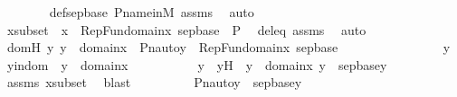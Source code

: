 \begin{isabellebody}
\ \ \ \ \ \ \isamarkupfalse%
\ def{\isacharunderscore}{\kern0pt}sep{\isacharunderscore}{\kern0pt}base\ P{\isacharunderscore}{\kern0pt}name{\isacharunderscore}{\kern0pt}in{\isacharunderscore}{\kern0pt}M\ assms{}\ \isamarkupfalse%
\ auto\ \isanewline
\ \ \ \ \isamarkupfalse%
\ xsubset\ {\isacharcolon}{\kern0pt}\ {\isachardoublequoteopen}x\ {\isasymsubseteq}\ {\isasymUnion}RepFun{\isacharparenleft}{\kern0pt}domain{\isacharparenleft}{\kern0pt}x{}{\isacharparenright}{\kern0pt}{\isacharcomma}{\kern0pt}\ sep{\isacharunderscore}{\kern0pt}base{\isacharparenright}{\kern0pt}\ {\isasymtimes}\ P{\isachardoublequoteclose}\ \isamarkupfalse%
\ deleq\ assms{}\ \isamarkupfalse%
\ auto\ \ \isanewline
\isanewline
\ \ \ \ \isamarkupfalse%
\ domH{\isacharcolon}{\kern0pt}\ {\isachardoublequoteopen}{\isasymAnd}y{\isachardot}{\kern0pt}\ y\ {\isasymin}\ domain{\isacharparenleft}{\kern0pt}x{\isacharparenright}{\kern0pt}\ {\isasymLongrightarrow}\ Pn{\isacharunderscore}{\kern0pt}auto{\isacharparenleft}{\kern0pt}{\isasympi}{\isacharparenright}{\kern0pt}{\isacharbackquote}{\kern0pt}y\ {\isasymin}\ {\isasymUnion}RepFun{\isacharparenleft}{\kern0pt}domain{\isacharparenleft}{\kern0pt}x{}{\isacharparenright}{\kern0pt}{\isacharcomma}{\kern0pt}\ sep{\isacharunderscore}{\kern0pt}base{\isacharparenright}{\kern0pt}{\isachardoublequoteclose}\ \isanewline
\ \ \ \ \isamarkupfalse%
\ {\isacharminus}{\kern0pt}\ \isanewline
\ \ \ \ \ \ \isamarkupfalse%
\ y\ \isamarkupfalse%
\ yindom\ {\isacharcolon}{\kern0pt}\ {\isachardoublequoteopen}y\ {\isasymin}\ domain{\isacharparenleft}{\kern0pt}x{\isacharparenright}{\kern0pt}{\isachardoublequoteclose}\ \isanewline
\ \ \ \ \ \ \isamarkupfalse%
\ \isamarkupfalse%
\ y{}\ \ y{}H\ {\isacharcolon}{\kern0pt}\ {\isachardoublequoteopen}y{}\ {\isasymin}\ domain{\isacharparenleft}{\kern0pt}x{}{\isacharparenright}{\kern0pt}{\isachardoublequoteclose}\ {\isachardoublequoteopen}y\ {\isasymin}\ sep{\isacharunderscore}{\kern0pt}base{\isacharparenleft}{\kern0pt}y{}{\isacharparenright}{\kern0pt}{\isachardoublequoteclose}\ \isamarkupfalse%
\ assms\ xsubset\ \isamarkupfalse%
\ blast\isanewline
\ \ \ \ \ \ \isamarkupfalse%
\ \isamarkupfalse%
\ {\isachardoublequoteopen}Pn{\isacharunderscore}{\kern0pt}auto{\isacharparenleft}{\kern0pt}{\isasympi}{\isacharparenright}{\kern0pt}{\isacharbackquote}{\kern0pt}y\ {\isasymin}\ sep{\isacharunderscore}{\kern0pt}base{\isacharparenleft}{\kern0pt}y{}{\isacharparenright}{\kern0pt}{\isachardoublequoteclose}\ \isamarkupfalse%

\end{isabellebody}
